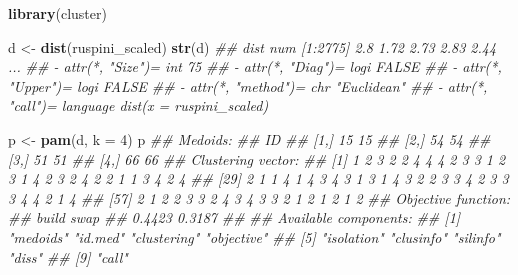 \documentclass[
  notitlepage]{book}
\newenvironment{Shaded}{\begin{snugshade}}{\end{snugshade}}
\newcommand{\CommentTok}[1]{\textcolor[rgb]{0.56,0.35,0.01}{\textit{#1}}}
\newcommand{\DataTypeTok}[1]{\textcolor[rgb]{0.13,0.29,0.53}{#1}}
\newcommand{\DecValTok}[1]{\textcolor[rgb]{0.00,0.00,0.81}{#1}}
\newcommand{\ErrorTok}[1]{\textcolor[rgb]{0.64,0.00,0.00}{\textbf{#1}}}
\newcommand{\KeywordTok}[1]{\textcolor[rgb]{0.13,0.29,0.53}{\textbf{#1}}}
\newcommand{\NormalTok}[1]{#1}
\newcommand{\OperatorTok}[1]{\textcolor[rgb]{0.81,0.36,0.00}{\textbf{#1}}}
\newcommand{\StringTok}[1]{\textcolor[rgb]{0.31,0.60,0.02}{#1}}
\begin{document}
\begin{Shaded}
\begin{Highlighting}[]
\KeywordTok{library}\NormalTok{(cluster)}

\NormalTok{d \textless{}{-}}\StringTok{ }\KeywordTok{dist}\NormalTok{(ruspini\_scaled)}
\KeywordTok{str}\NormalTok{(d)}
\CommentTok{\#\#  \textquotesingle{}dist\textquotesingle{} num [1:2775] 2.8 1.72 2.73 2.83 2.44 ...}
\CommentTok{\#\#  {-} attr(*, "Size")= int 75}
\CommentTok{\#\#  {-} attr(*, "Diag")= logi FALSE}
\CommentTok{\#\#  {-} attr(*, "Upper")= logi FALSE}
\CommentTok{\#\#  {-} attr(*, "method")= chr "Euclidean"}
\CommentTok{\#\#  {-} attr(*, "call")= language dist(x = ruspini\_scaled)}
\end{Highlighting}
\end{Shaded}

\begin{Shaded}
\begin{Highlighting}[]
\NormalTok{p \textless{}{-}}\StringTok{ }\KeywordTok{pam}\NormalTok{(d, }\DataTypeTok{k =} \DecValTok{4}\NormalTok{)}
\NormalTok{p}
\CommentTok{\#\# Medoids:}
\CommentTok{\#\#      ID   }
\CommentTok{\#\# [1,] 15 15}
\CommentTok{\#\# [2,] 54 54}
\CommentTok{\#\# [3,] 51 51}
\CommentTok{\#\# [4,] 66 66}
\CommentTok{\#\# Clustering vector:}
\CommentTok{\#\#  [1] 1 2 3 2 2 4 4 4 2 3 3 1 2 3 1 4 2 3 2 4 2 2 1 1 3 4 2 4}
\CommentTok{\#\# [29] 2 1 1 4 1 4 3 4 3 1 3 1 4 3 2 2 3 3 4 2 3 3 3 4 4 2 1 4}
\CommentTok{\#\# [57] 2 1 2 2 3 3 2 4 3 4 3 3 2 1 2 1 2 1 2}
\CommentTok{\#\# Objective function:}
\CommentTok{\#\#  build   swap }
\CommentTok{\#\# 0.4423 0.3187 }
\CommentTok{\#\# }
\CommentTok{\#\# Available components:}
\CommentTok{\#\# [1] "medoids"    "id.med"     "clustering" "objective" }
\CommentTok{\#\# [5] "isolation"  "clusinfo"   "silinfo"    "diss"      }
\CommentTok{\#\# [9] "call"}
\end{Highlighting}
\end{Shaded}

\begin{Shaded}
\end{Shaded}
\end{document}
